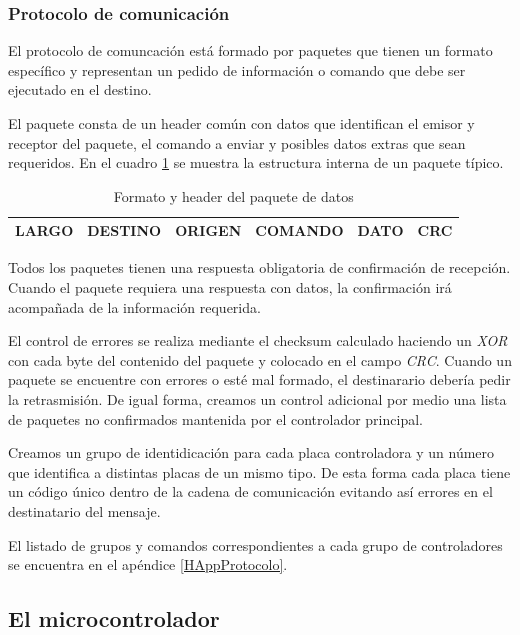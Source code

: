 \subsubsection{Protocolo de comunicaci\'on}
\label{HCprotocolo}

El protocolo de comuncaci\'on est\'a formado por paquetes que tienen un formato espec\'ifico y representan un pedido de informaci\'on o
comando que debe ser ejecutado en el destino. 

El paquete consta de un header com\'un con datos que identifican el emisor y receptor del paquete, el comando a enviar y posibles datos
extras que sean requeridos. En el cuadro \ref{Hformato_paquete_tabla} se muestra la estructura interna de un paquete t\'ipico.

\begin{table}[ht]
	\begin{center}
		\begin{tabular}{|c|c|c|c|c|c|}
			\hline
			LARGO & DESTINO & ORIGEN & COMANDO & DATO & CRC \\
			\hline
		\end{tabular}
	\caption{Formato y header del paquete de datos}
	\label{Hformato_paquete_tabla}
	\end{center}
\end{table}

Todos los paquetes tienen una respuesta obligatoria de confirmaci\'on de recepci\'on. Cuando el paquete requiera una respuesta
con datos, la confirmaci\'on ir\'a acompa\~nada de la informaci\'on requerida.

El control de errores se realiza mediante el checksum calculado haciendo un \emph{XOR} con cada byte del contenido del paquete
y colocado en el campo \emph{CRC}. Cuando un paquete se encuentre con errores o est\'e mal formado, el destinarario deber\'ia
pedir la retrasmisi\'on. De igual forma, creamos un control adicional por medio una lista de paquetes no confirmados mantenida
por el controlador principal.

Creamos un grupo de identidicaci\'on para cada placa controladora y un n\'umero que identifica a distintas placas de un mismo
tipo. De esta forma cada placa tiene un c\'odigo \'unico dentro de la cadena de comunicaci\'on evitando as\'i errores en el
destinatario del mensaje.

El listado de grupos y comandos correspondientes a cada grupo de controladores se encuentra en el ap\'endice \ref{HAppProtocolo}.

\subsection{El microcontrolador}
\label{Hmicro}

